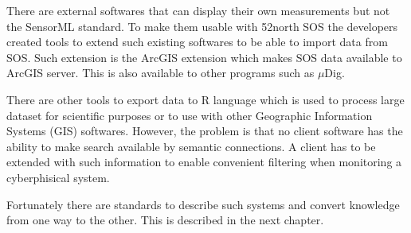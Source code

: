 There are external softwares that can display their own measurements but not the SensorML standard. To make them usable with 52north SOS the developers created tools to extend such existing softwares to be able to import data from SOS.
Such extension is the ArcGIS extension which makes SOS data available to ArcGIS server. This is also available to other programs such as $\mu$Dig. 

There are other tools to export data to R language which is used to process large dataset for scientific purposes or to use with other Geographic Information Systems (GIS) softwares. However, the problem is that no client software has the ability to make search available by semantic connections. A client has to be extended with such information to enable convenient filtering when monitoring a cyberphisical system.

Fortunately there are standards to describe such systems and convert knowledge from one way to the other. This is described in the next chapter.
